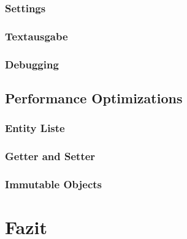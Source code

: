 		\subsubsection{Settings}
		\subsubsection{Textausgabe}
		\subsubsection{Debugging}
	\subsection{Performance Optimizations}
		\subsubsection{Entity Liste}
		\subsubsection{Getter and Setter}
		\subsubsection{Immutable Objects}
\section{Fazit}